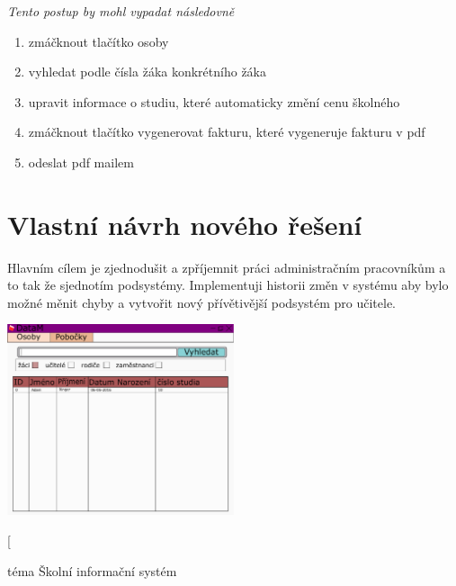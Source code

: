 \documentclass[a4paper, 11pt, twocolumn]{article}
\begin{document}
	\vspace*{0.2cm}
   	\textit{Tento postup by mohl vypadat následovně}
	\vspace*{0.2cm}
	
   	\begin{enumerate}
        \item zmáčknout tlačítko osoby
        \vspace{-0.2cm}
        \item vyhledat podle čísla žáka konkrétního žáka
        \vspace{-0.2cm}
        \item  upravit informace o studiu, které automaticky změní cenu školného
        \vspace{-0.2cm}
        \item  zmáčknout tlačítko vygenerovat fakturu, které vygeneruje fakturu v pdf
        \vspace{-0.2cm}
        \item  odeslat pdf mailem
        \vspace{-0.2cm}
   	\end{enumerate}

	\newpage

	\section*{\large{Vlastní návrh nového řešení}}
	\vspace*{-0.2cm}
	Hlavním cílem je zjednodušit a zpříjemnit práci administračním pracovníkům a to tak že sjednotím podsystémy. Implementuji historii změn v systému 
	aby bylo možné měnit chyby a vytvořit nový přívětivější podsystém pro učitele.

	\begin{center}
	\includegraphics[width=0.5\textwidth]{GUI.pdf}
	\end{center}


	\newpage


	\twocolumn[{
	{\Large téma Školní informační systém\par}}
	\par\vspace*{0.8cm}
\end{document}
